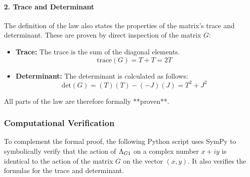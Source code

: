\paragraph{2. Trace and Determinant}
The definition of the law also states the properties of the matrix's trace and determinant. These are proven by direct inspection of the matrix $G$:
\begin{itemize}
    \item \textbf{Trace:} The trace is the sum of the diagonal elements.
    $$ \text{trace}(G) = T + T = 2T $$
    \item \textbf{Determinant:} The determinant is calculated as follows:
    $$ \text{det}(G) = (T)(T) - (-J)(J) = T^2 + J^2 $$
\end{itemize}
All parts of the law are therefore formally **proven**.

\subsubsection*{Computational Verification}
To complement the formal proof, the following Python script uses SymPy to symbolically verify that the action of $\Lambda_{G1}$ on a complex number $x+iy$ is identical to the action of the matrix $G$ on the vector $(x,y)$. It also verifies the formulas for the trace and determinant.


